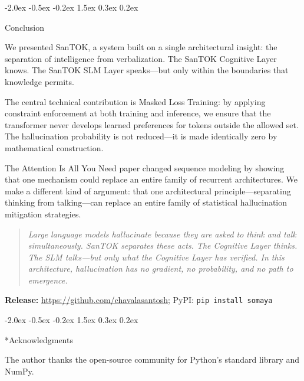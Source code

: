 \documentclass[10pt]{article}
\makeatletter
\renewcommand{\section}{\@startsection{section}{1}{\z@}%
  {-2.0ex \@plus -0.5ex \@minus -0.2ex}%
  {1.5ex \@plus 0.3ex \@minus 0.2ex}%
  {\large\bfseries\raggedright}}
\makeatother
\begin{document}
\section{Conclusion}

We presented SanTOK, a system built on a single architectural insight: the separation
of intelligence from verbalization. The SanTOK Cognitive Layer knows. The SanTOK SLM
Layer speaks---but only within the boundaries that knowledge permits.

The central technical contribution is Masked Loss Training: by applying constraint
enforcement at both training and inference, we ensure that the transformer never
develops learned preferences for tokens outside the allowed set. The hallucination
probability is not reduced---it is made identically zero by mathematical construction.

The Attention Is All You Need paper changed sequence modeling by showing that one
mechanism could replace an entire family of recurrent architectures. We make a
different kind of argument: that one architectural principle---separating thinking from
talking---can replace an entire family of statistical hallucination mitigation
strategies.

\begin{quote}
\textit{Large language models hallucinate because they are asked to think and talk
simultaneously. SanTOK separates these acts. The Cognitive Layer thinks. The SLM
talks---but only what the Cognitive Layer has verified. In this architecture,
hallucination has no gradient, no probability, and no path to emergence.}
\end{quote}

\textbf{Release:} \url{https://github.com/chavalasantosh};
PyPI: \texttt{pip install somaya}

\section*{Acknowledgments}

The author thanks the open-source community for Python's standard library and NumPy.
\end{document}
